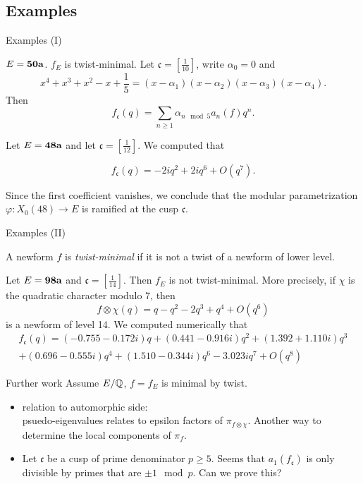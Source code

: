 \documentclass[handout]{beamer}
\newcommand{\fc}{\mathfrak{c}}
\begin{document}
\subsection{Examples}

\begin{frame}{Examples (I)}

\begin{Example}
$E = {\bf 50a}$. $f_E$ is twist-minimal. Let  $\fc = [\frac{1}{10}]$, write $\alpha_0 = 0$ and 
\[
	x^4 + x^3 + x^2 - x + \frac{1}{5} = (x-\alpha_1) (x-\alpha_2)(x-\alpha_3)(x-\alpha_4).
\]
Then 
\[
	f_{\fc}(q) = \sum_{n \geq 1}  \alpha_{n \mod 5} a_n(f) q^n.
\]
\end{Example}

\begin{Example}
Let $E = {\bf 48a}$ and let $\fc = \left[\frac{1}{12}\right]$.  We computed that 

$$f_\fc(q) =  -2iq^2 + 2iq^6 + O(q^7).$$

Since the first coefficient vanishes, we conclude that the modular parametrization $\varphi: X_0(48) \to E$ is ramified at the cusp $\fc$. 
\end{Example}
\end{frame}


\begin{frame}{Examples (II)}
\begin{Definition}
A newform $f$ is {\it twist-minimal} if it is not a twist of a newform of lower level. 
\end{Definition}
\begin{Example}
Let $E = {\bf 98a}$ and $\fc = [\frac{1}{14}]$. Then $f_E$ is not twist-minimal. More precisely, if $\chi$ is the quadratic character modulo 7, then 
\[
	f \otimes \chi  (q) =  q - q^2 - 2q^3 + q^4 + O(q^6)
\] 
is a newform of level 14.  We computed numerically that 
{\footnotesize
\begin{align*}
f_\fc(q) = \left(-0.755 - 0.172i\right)q + \left(0.441 - 0.916i\right)q^{2} 
+ \left(1.392+ 1.110i\right)q^{3} \\ + \left(0.696 - 0.555i\right)q^{4} 
+ \left(1.510 - 0.344i\right)q^{6} - 3.023i q^{7} + O(q^8) 
\end{align*}
}
\end{Example}
\end{frame}



\begin{frame}{Further work}
Assume $E/\mathbb{Q}$, $f = f_E$ is minimal by twist. 
\begin{itemize}
\item relation to automorphic side: \\ psuedo-eigenvalues relates to epsilon factors of $\pi_{f \otimes \chi}$. Another way to determine the local components of $\pi_f$. 
 
\item Let $\fc$ be a cusp of prime denominator $p \geq 5$. Seems that $a_1(f_\fc)$ is only divisible by primes that are $\pm 1 \mod{p}$. Can we prove this? 
 \end{itemize}
\end{frame}
\end{document}
